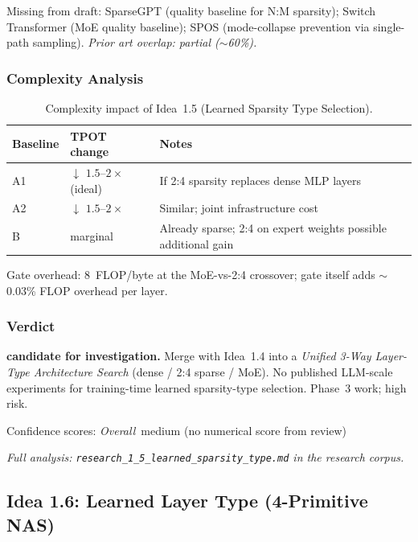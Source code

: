 \documentclass[11pt]{article}
\begin{document}
\noindent
Missing from draft: SparseGPT \cite{FrantatAlistarh2023} (quality baseline for N:M sparsity); Switch Transformer (MoE quality baseline); SPOS (mode-collapse prevention via single-path sampling).
\emph{Prior art overlap: partial ($\sim$60\%).}

\subsubsection*{Complexity Analysis}

\begin{table}[h]
\centering
\caption{Complexity impact of Idea~1.5 (Learned Sparsity Type Selection).}
\label{tab:complexity-1-5}
\begin{tabular}{llp{7cm}}
\toprule
\textbf{Baseline} & \textbf{TPOT change} & \textbf{Notes} \\
\midrule
A1 & $\downarrow$ $1.5$--$2\times$ (ideal) & If 2:4 sparsity replaces dense MLP layers \\
A2 & $\downarrow$ $1.5$--$2\times$ & Similar; joint infrastructure cost \\
B  & marginal & Already sparse; 2:4 on expert weights possible additional gain \\
\bottomrule
\end{tabular}
\end{table}

\noindent
Gate overhead: 8~FLOP/byte at the MoE-vs-2:4 crossover; gate itself adds $\sim$0.03\% FLOP overhead per layer.

\subsubsection*{Verdict}
\textbf{candidate for investigation.}
Merge with Idea~1.4 into a \emph{Unified 3-Way Layer-Type Architecture Search} (dense / 2:4 sparse / MoE).
No published LLM-scale experiments for training-time learned sparsity-type selection.
Phase~3 work; high risk.

\noindent
Confidence scores:
\emph{Overall}~medium (no numerical score from review)
\par\noindent\textit{Full analysis: \texttt{research\_1\_5\_learned\_sparsity\_type.md} in the research corpus.}


\subsection{Idea 1.6: Learned Layer Type (4-Primitive NAS)}
\label{subsec:idea-1-6}
\end{document}
